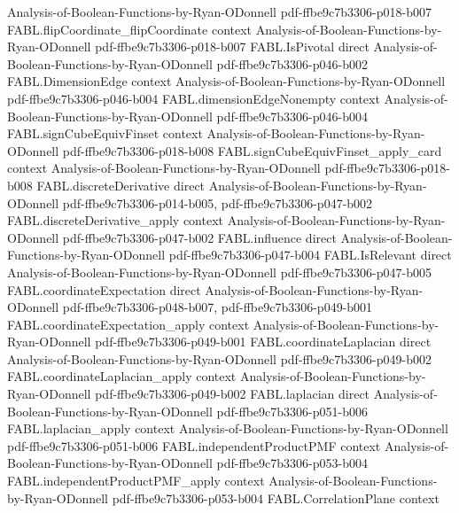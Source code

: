 \begin{theorem}
  {Analysis-of-Boolean-Functions-by-Ryan-ODonnell}
  {pdf-ffbe9c7b3306-p018-b007}
\proofstep
  {FABL.flipCoordinate_flipCoordinate}
  {context}
  {Analysis-of-Boolean-Functions-by-Ryan-ODonnell}
  {pdf-ffbe9c7b3306-p018-b007}
\proofstep
  {FABL.IsPivotal}
  {direct}
  {Analysis-of-Boolean-Functions-by-Ryan-ODonnell}
  {pdf-ffbe9c7b3306-p046-b002}
\proofstep
  {FABL.DimensionEdge}
  {context}
  {Analysis-of-Boolean-Functions-by-Ryan-ODonnell}
  {pdf-ffbe9c7b3306-p046-b004}
\proofstep
  {FABL.dimensionEdgeNonempty}
  {context}
  {Analysis-of-Boolean-Functions-by-Ryan-ODonnell}
  {pdf-ffbe9c7b3306-p046-b004}
\proofstep
  {FABL.signCubeEquivFinset}
  {context}
  {Analysis-of-Boolean-Functions-by-Ryan-ODonnell}
  {pdf-ffbe9c7b3306-p018-b008}
\proofstep
  {FABL.signCubeEquivFinset_apply_card}
  {context}
  {Analysis-of-Boolean-Functions-by-Ryan-ODonnell}
  {pdf-ffbe9c7b3306-p018-b008}
\proofstep
  {FABL.discreteDerivative}
  {direct}
  {Analysis-of-Boolean-Functions-by-Ryan-ODonnell}
  {pdf-ffbe9c7b3306-p014-b005,
    pdf-ffbe9c7b3306-p047-b002}
\proofstep
  {FABL.discreteDerivative_apply}
  {context}
  {Analysis-of-Boolean-Functions-by-Ryan-ODonnell}
  {pdf-ffbe9c7b3306-p047-b002}
\proofstep
  {FABL.influence}
  {direct}
  {Analysis-of-Boolean-Functions-by-Ryan-ODonnell}
  {pdf-ffbe9c7b3306-p047-b004}
\proofstep
  {FABL.IsRelevant}
  {direct}
  {Analysis-of-Boolean-Functions-by-Ryan-ODonnell}
  {pdf-ffbe9c7b3306-p047-b005}
\proofstep
  {FABL.coordinateExpectation}
  {direct}
  {Analysis-of-Boolean-Functions-by-Ryan-ODonnell}
  {pdf-ffbe9c7b3306-p048-b007,
    pdf-ffbe9c7b3306-p049-b001}
\proofstep
  {FABL.coordinateExpectation_apply}
  {context}
  {Analysis-of-Boolean-Functions-by-Ryan-ODonnell}
  {pdf-ffbe9c7b3306-p049-b001}
\proofstep
  {FABL.coordinateLaplacian}
  {direct}
  {Analysis-of-Boolean-Functions-by-Ryan-ODonnell}
  {pdf-ffbe9c7b3306-p049-b002}
\proofstep
  {FABL.coordinateLaplacian_apply}
  {context}
  {Analysis-of-Boolean-Functions-by-Ryan-ODonnell}
  {pdf-ffbe9c7b3306-p049-b002}
\proofstep
  {FABL.laplacian}
  {direct}
  {Analysis-of-Boolean-Functions-by-Ryan-ODonnell}
  {pdf-ffbe9c7b3306-p051-b006}
\proofstep
  {FABL.laplacian_apply}
  {context}
  {Analysis-of-Boolean-Functions-by-Ryan-ODonnell}
  {pdf-ffbe9c7b3306-p051-b006}
\proofstep
  {FABL.independentProductPMF}
  {context}
  {Analysis-of-Boolean-Functions-by-Ryan-ODonnell}
  {pdf-ffbe9c7b3306-p053-b004}
\proofstep
  {FABL.independentProductPMF_apply}
  {context}
  {Analysis-of-Boolean-Functions-by-Ryan-ODonnell}
  {pdf-ffbe9c7b3306-p053-b004}
\proofstep
  {FABL.CorrelationPlane}
  {context}

\end{theorem}
